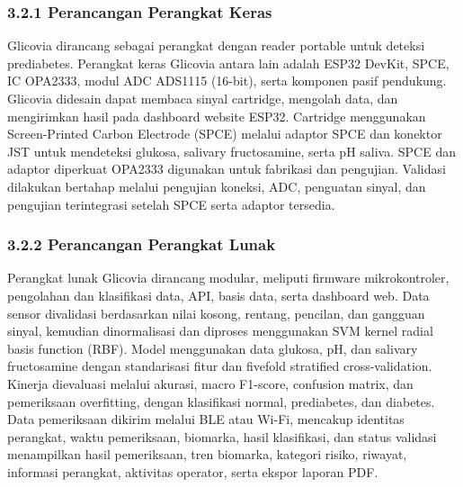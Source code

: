 \documentclass[12pt,a4paper]{article}
\begin{document}
\subsubsection*{3.2.1 Perancangan Perangkat Keras}
Glicovia dirancang sebagai perangkat dengan reader portable untuk deteksi prediabetes. Perangkat keras Glicovia antara lain adalah ESP32 DevKit, SPCE, IC OPA2333, modul ADC ADS1115 (16-bit), serta komponen pasif pendukung. Glicovia didesain dapat membaca sinyal cartridge, mengolah data, dan mengirimkan hasil pada dashboard website ESP32. Cartridge menggunakan Screen-Printed Carbon Electrode (SPCE) melalui adaptor SPCE dan konektor JST untuk mendeteksi glukosa, salivary fructosamine, serta pH saliva. SPCE dan adaptor diperkuat OPA2333 digunakan untuk fabrikasi dan pengujian. Validasi dilakukan bertahap melalui pengujian koneksi, ADC, penguatan sinyal, dan pengujian terintegrasi setelah SPCE serta adaptor tersedia.

\subsubsection*{3.2.2 Perancangan Perangkat Lunak}
Perangkat lunak Glicovia dirancang modular, meliputi firmware mikrokontroler, pengolahan dan klasifikasi data, API, basis data, serta dashboard web. Data sensor divalidasi berdasarkan nilai kosong, rentang, pencilan, dan gangguan sinyal, kemudian dinormalisasi dan diproses menggunakan SVM kernel radial basis function (RBF). Model menggunakan data glukosa, pH, dan salivary fructosamine dengan standarisasi fitur dan fivefold stratified cross-validation. Kinerja dievaluasi melalui akurasi, macro F1-score, confusion matrix, dan pemeriksaan overfitting, dengan klasifikasi normal, prediabetes, dan diabetes. Data pemeriksaan dikirim melalui BLE atau Wi-Fi, mencakup identitas perangkat, waktu pemeriksaan, biomarka, hasil klasifikasi, dan status validasi menampilkan hasil pemeriksaan, tren biomarka, kategori risiko, riwayat, informasi perangkat, aktivitas operator, serta ekspor laporan PDF.
\end{document}
